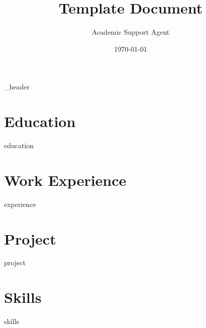 \documentclass{article}
\title{Template Document}
\author{Academic Support Agent}
\date{\today}
\begin{document}
\maketitle

{_header}
\vspace*{10pt}

\section{Education}
{education}
\vspace*{10pt}

\section{Work Experience}
{experience}
\vspace*{10pt}

\section{Project}
\vspace*{3pt}
{project}
\vspace*{10pt}

\section{Skills}
\vspace*{3pt}
{skills}
\vspace*{10pt}
\end{document}
